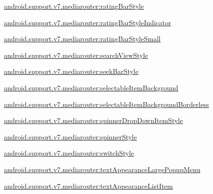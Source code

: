 {\ttfamily \hyperlink{classandroid_1_1support_1_1v7_1_1mediarouter_1_1R_1_1styleable_ab10f79a17ff8b7943d3a05296cc7e765}{android.\+support.\+v7.\+mediarouter\+:rating\+Bar\+Style}}

{\ttfamily \hyperlink{classandroid_1_1support_1_1v7_1_1mediarouter_1_1R_1_1styleable_adbfc1fbc4a808f8fe9c21f5cebc0979e}{android.\+support.\+v7.\+mediarouter\+:rating\+Bar\+Style\+Indicator}}

{\ttfamily \hyperlink{classandroid_1_1support_1_1v7_1_1mediarouter_1_1R_1_1styleable_a851e1e8d644ea5c0306da068a33f70d1}{android.\+support.\+v7.\+mediarouter\+:rating\+Bar\+Style\+Small}}

{\ttfamily \hyperlink{classandroid_1_1support_1_1v7_1_1mediarouter_1_1R_1_1styleable_ae78fcc03ef34fe74c5a9824c9cb8df51}{android.\+support.\+v7.\+mediarouter\+:search\+View\+Style}}

{\ttfamily \hyperlink{classandroid_1_1support_1_1v7_1_1mediarouter_1_1R_1_1styleable_a94480fbd3dc2f8051c48e89dbc33eab6}{android.\+support.\+v7.\+mediarouter\+:seek\+Bar\+Style}}

{\ttfamily \hyperlink{classandroid_1_1support_1_1v7_1_1mediarouter_1_1R_1_1styleable_ae6b277bbde29a995524dbf2f764ec5b8}{android.\+support.\+v7.\+mediarouter\+:selectable\+Item\+Background}}

{\ttfamily \hyperlink{classandroid_1_1support_1_1v7_1_1mediarouter_1_1R_1_1styleable_a4b17798c04e6d1bb8e749b5feb1aae89}{android.\+support.\+v7.\+mediarouter\+:selectable\+Item\+Background\+Borderless}}

{\ttfamily \hyperlink{classandroid_1_1support_1_1v7_1_1mediarouter_1_1R_1_1styleable_a7d8b19a24b9742bcfc7efca0b97d4088}{android.\+support.\+v7.\+mediarouter\+:spinner\+Drop\+Down\+Item\+Style}}

{\ttfamily \hyperlink{classandroid_1_1support_1_1v7_1_1mediarouter_1_1R_1_1styleable_ad25bcd6aab6c43bde798b7d59a6ad960}{android.\+support.\+v7.\+mediarouter\+:spinner\+Style}}

{\ttfamily \hyperlink{classandroid_1_1support_1_1v7_1_1mediarouter_1_1R_1_1styleable_a45f08971148574331038a7defe008f80}{android.\+support.\+v7.\+mediarouter\+:switch\+Style}}

{\ttfamily \hyperlink{classandroid_1_1support_1_1v7_1_1mediarouter_1_1R_1_1styleable_acfb438324ed2a40724401765634c986a}{android.\+support.\+v7.\+mediarouter\+:text\+Appearance\+Large\+Popup\+Menu}}

{\ttfamily \hyperlink{classandroid_1_1support_1_1v7_1_1mediarouter_1_1R_1_1styleable_ae585f2ef6f2ff59cc4f7be52f5ce8f26}{android.\+support.\+v7.\+mediarouter\+:text\+Appearance\+List\+Item}}


